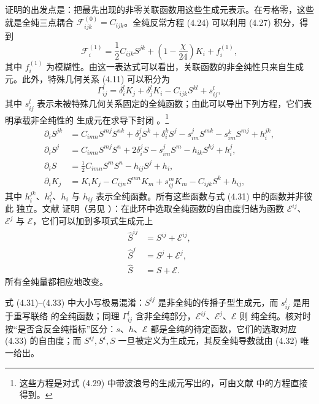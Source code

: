 证明的出发点是：把最先出现的非零关联函数用这些生成元表示。在亏格零，这些就是全纯三点耦合
$\mathcal{F}^{(0)}_{ijk}=C_{ijk}$。全纯反常方程 (4.24) 可以利用 (4.27) 积分，得到
\begin{equation}\tag{4.30}
\mathcal{F}^{(1)}_i
= \frac{1}{2}C_{ijk}S^{jk} + \left(1-\frac{\chi}{24}\right)K_i + f^{(1)}_i,
\end{equation}
其中 $f^{(1)}_i$ 为模糊性。由这一表达式可以看出，关联函数的非全纯性只来自生成元。此外，特殊几何关系
(4.11) 可以积分为
\begin{equation}\tag{4.31}
\Gamma^l_{ij} = \delta^l_i K_j + \delta^l_j K_i - C_{ijk}S^{kl} + s^l_{ij},
\end{equation}
其中 $s^l_{ij}$ 表示未被特殊几何关系固定的全纯函数；由此可以导出下列方程，它们表明承载非全纯性的
生成元在求导下封闭 \cite{ref22}。\footnote{这些方程是对式 (4.29) 中带波浪号的生成元写出的，可由文献 \cite{ref22}
中的方程直接得到。}
\begin{equation}\tag{4.32}
\begin{aligned}
  \partial_i S^{jk} &= C_{imn}S^{mj}S^{nk} + \delta^j_i S^k + \delta^k_i S^j
      - s^j_{im}S^{mk} - s^k_{im}S^{mj} + h_i^{jk}, \\
  \partial_i S^j &= C_{imn}S^{mj}S^n + 2\delta^j_i S
      - s^j_{im}S^m - h_{ik}S^{kj} + h^j_i, \\
  \partial_i S &= \frac{1}{2}C_{imn}S^m S^n - h_{ij}S^j + h_i, \\
  \partial_i K_j &= K_iK_j - C_{ijn}S^{mn}K_m + s^m_{ij}K_m - C_{ijk}S^k + h_{ij},
\end{aligned}
\end{equation}
其中 $h_i^{jk}$、$h_i^j$、$h_i$ 与 $h_{ij}$ 表示全纯函数。所有这些函数与式 (4.31) 中的函数并非彼此
独立。文献 \cite{ref26} 证明（另见 \cite{ref25}）：在此环中选取全纯函数的自由度归结为函数 $\mathcal{E}^{ij}$、
$\mathcal{E}^j$ 与 $\mathcal{E}$，它们可以加到多项式生成元上
\begin{equation}\tag{4.33}
\begin{aligned}
  \widehat{S}^{ij} &= S^{ij} + \mathcal{E}^{ij}, \\
  \widehat{S}^j &= S^j + \mathcal{E}^j, \\
  \widehat{S} &= S + \mathcal{E}.
\end{aligned}
\end{equation}
所有全纯量都相应地改变。

\begin{yizhu}[易错点]
式 (4.31)--(4.33) 中大小写极易混淆：$S^{ij}$ 是非全纯的传播子型生成元，而 $s^l_{ij}$ 是用于重写联络
的全纯函数；同理 $\Gamma^l_{ij}$ 含非全纯部分，$\mathcal{E}^{ij}$、$\mathcal{E}^j$、$\mathcal{E}$ 则
纯全纯。核对时按“是否含反全纯指标”区分：$s$、$h$、$\mathcal{E}$ 都是全纯的待定函数，它们的选取对应
(4.33) 的自由度；而 $S^{ij},S^i,S$ 一旦被定义为生成元，其反全纯导数就由 (4.32) 唯一给出。
\end{yizhu}

